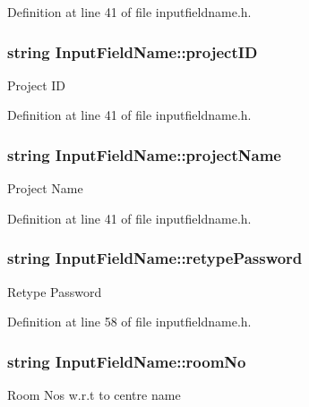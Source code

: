 Definition at line 41 of file inputfieldname.\-h.

\hypertarget{classInputFieldName_ac4bd117f3137956473f1a1d5ce9106a5}{
\subsubsection[{project\-I\-D}]{\setlength{\rightskip}{0pt plus 5cm}string Input\-Field\-Name\-::project\-I\-D}}\label{classInputFieldName_ac4bd117f3137956473f1a1d5ce9106a5}
Project I\-D 

Definition at line 41 of file inputfieldname.\-h.

\hypertarget{classInputFieldName_ab93b034743570810afe89aea88a7bbf6}{
\subsubsection[{project\-Name}]{\setlength{\rightskip}{0pt plus 5cm}string Input\-Field\-Name\-::project\-Name}}\label{classInputFieldName_ab93b034743570810afe89aea88a7bbf6}
Project Name 

Definition at line 41 of file inputfieldname.\-h.

\hypertarget{classInputFieldName_acd50095ae8540a735bcd5787b904b06c}{
\subsubsection[{retype\-Password}]{\setlength{\rightskip}{0pt plus 5cm}string Input\-Field\-Name\-::retype\-Password}}\label{classInputFieldName_acd50095ae8540a735bcd5787b904b06c}
Retype Password 

Definition at line 58 of file inputfieldname.\-h.

\hypertarget{classInputFieldName_abb6b245e03e76aa29d7ef8733298e72f}{
\subsubsection[{room\-No}]{\setlength{\rightskip}{0pt plus 5cm}string Input\-Field\-Name\-::room\-No}}\label{classInputFieldName_abb6b245e03e76aa29d7ef8733298e72f}
Room Nos w.\-r.\-t to centre name 

